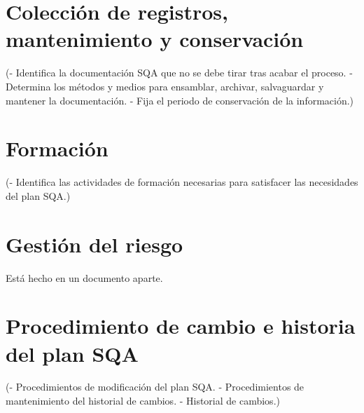 \documentclass[spanish,a4paper,11pt, twoside]{report}	%
\begin{document}
\chapter{ Colección de registros, mantenimiento y conservación}
	(- Identifica la documentación SQA que no se debe
	tirar tras acabar el proceso.
	- Determina los métodos y medios para ensamblar,
	archivar, salvaguardar y mantener la documentación.
	- Fija el periodo de conservación de la información.)

\newpage
\mbox{}
\thispagestyle{empty}						%
\newpage

\chapter{ \hspace{0.25cm}Formación}
	(- Identifica las actividades de formación necesarias
	para satisfacer las necesidades del plan SQA.)

\newpage
\mbox{}
\thispagestyle{empty}						%
\newpage

\chapter{ \hspace{0.25cm}Gestión del riesgo}
	Está hecho en un documento aparte.


\newpage
\mbox{}
\thispagestyle{empty}						%
\newpage

\chapter{ Procedimiento de cambio e historia del plan SQA}
	(- Procedimientos de modificación del plan SQA.
	- Procedimientos de mantenimiento del historial de
	cambios.
	- Historial de cambios.)
	


\newpage
\mbox{}
\thispagestyle{empty}						%
\newpage
\end{document}

